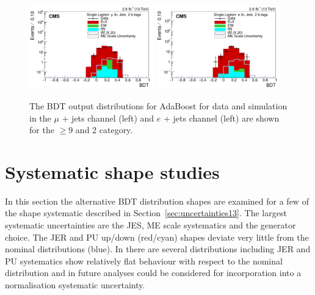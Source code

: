 \begin{figure}[ht!]
    \includegraphics[width=0.48\textwidth]{images/Run2/BDT_Mu29Aug400trees_5MinNodeSize_20nCuts_3MaxDepth_5adaboostbeta_adaBoost_alphaSTune_noMinEvents9nJets2nMtags_StackLogY.pdf}
    \includegraphics[width=0.48\textwidth]{images/Run2/BDT_El29Aug400trees_5MinNodeSize_20nCuts_3MaxDepth_5adaboostbeta_adaBoost_alphaSTune_noMinEvents9nJets2nMtags_StackLogY.pdf} 
    \caption{The BDT output distributions for AdaBoost for data and simulation in the $\mu$ + jets channel (left) and $e$ + jets channel (left) are shown for the $\geq9$ \njets  and 2 \nMtags category.}
    \label{fig:BDT_Mu29Aug400trees_5MinNodeSize_20nCuts_3MaxDepth_5adaboostbeta_adaBoost_alphaSTune_noMinEvents92}
\end{figure}


\section{Systematic shape studies \label{app:sysshapes}}

In this section the alternative BDT distribution shapes are examined for a few of the shape systematic described in Section~\ref{sec:uncertainties13}. The largest systematic uncertainties are the JES, ME scale systematics and the \ttbar generator choice. The JER and PU up/down (red/cyan) shapes deviate very little from the nominal distributions (blue). In \ttbar there are several distributions including JER and PU systematics show relatively flat behaviour with respect to the nominal distribution and in future analyses could be considered for incorporation into a normalisation systematic uncertainty.

